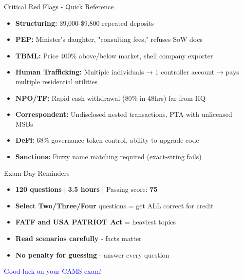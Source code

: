 \documentclass{beamer}
\begin{document}
		\begin{frame}{Critical Red Flags - Quick Reference}
			\begin{itemize}
				\item \textbf{Structuring:} \$9,000-\$9,800 repeated deposits
				\item \textbf{PEP:} Minister's daughter, "consulting fees," refuses SoW docs
				\item \textbf{TBML:} Price 400\% above/below market, shell company exporter
				\item \textbf{Human Trafficking:} Multiple individuals → 1 controller account → pays multiple residential utilities
				\item \textbf{NPO/TF:} Rapid cash withdrawal (80\% in 48hrs) far from HQ
				\item \textbf{Correspondent:} Undisclosed nested transactions, PTA with unlicensed MSBs
				\item \textbf{DeFi:} 68\% governance token control, ability to upgrade code
				\item \textbf{Sanctions:} Fuzzy name matching required (exact-string fails)
			\end{itemize}
		\end{frame}
		
		\begin{frame}{Exam Day Reminders}
			\begin{itemize}
				\item \textbf{120 questions} | \textbf{3.5 hours} | Passing score: \textbf{75}
				\item \textbf{Select Two/Three/Four} questions = get ALL correct for credit
				\item \textbf{FATF and USA PATRIOT Act} = heaviest topics
				\item \textbf{Read scenarios carefully} - facts matter
				\item \textbf{No penalty for guessing} - answer every question
			\end{itemize}
			\vspace{0.5cm}
			\centering
			\textcolor{blue}{\Large Good luck on your CAMS exam!}
		\end{frame}
		
	
\end{document}
